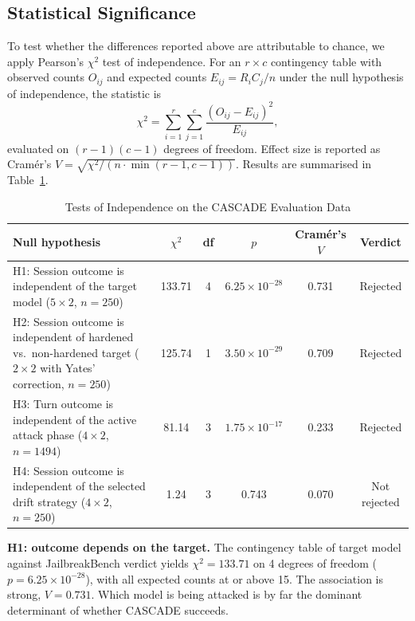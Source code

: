 \documentclass[conference]{IEEEtran}
\begin{document}
\subsection{Statistical Significance}
To test whether the differences reported above are attributable to chance, we apply Pearson's $\chi^2$ test of independence. For an $r \times c$ contingency table with observed counts $O_{ij}$ and expected counts $E_{ij} = R_i C_j / n$ under the null hypothesis of independence, the statistic is
\begin{equation}
\chi^2 = \sum_{i=1}^{r} \sum_{j=1}^{c} \frac{(O_{ij} - E_{ij})^2}{E_{ij}},
\end{equation}
evaluated on $(r-1)(c-1)$ degrees of freedom. Effect size is reported as Cram\'er's $V = \sqrt{\chi^2 / \left(n \cdot \min(r-1, c-1)\right)}$. Results are summarised in Table~\ref{tab:chi2}.

\begin{table}[htbp]
\centering
\caption{Tests of Independence on the CASCADE Evaluation Data}
\label{tab:chi2}
\begin{tabularx}{\linewidth}{X c c c c c}
\toprule
\textbf{Null hypothesis} & $\chi^2$ & \textbf{df} & $p$ & \textbf{Cram\'er's} $V$ & \textbf{Verdict} \\
\midrule
H1: Session outcome is independent of the target model ($5 \times 2$, $n = 250$) & 133.71 & 4 & $6.25 \times 10^{-28}$ & 0.731 & Rejected \\
H2: Session outcome is independent of hardened vs.\ non-hardened target ($2 \times 2$ with Yates' correction, $n = 250$) & 125.74 & 1 & $3.50 \times 10^{-29}$ & 0.709 & Rejected \\
H3: Turn outcome is independent of the active attack phase ($4 \times 2$, $n = 1494$) & 81.14 & 3 & $1.75 \times 10^{-17}$ & 0.233 & Rejected \\
H4: Session outcome is independent of the selected drift strategy ($4 \times 2$, $n = 250$) & 1.24 & 3 & 0.743 & 0.070 & Not rejected \\
\bottomrule
\end{tabularx}
\end{table}

\textbf{H1: outcome depends on the target.} The contingency table of target model against JailbreakBench verdict yields $\chi^2 = 133.71$ on 4 degrees of freedom ($p = 6.25 \times 10^{-28}$), with all expected counts at or above 15. The association is strong, $V = 0.731$. Which model is being attacked is by far the dominant determinant of whether CASCADE succeeds.
\end{document}
